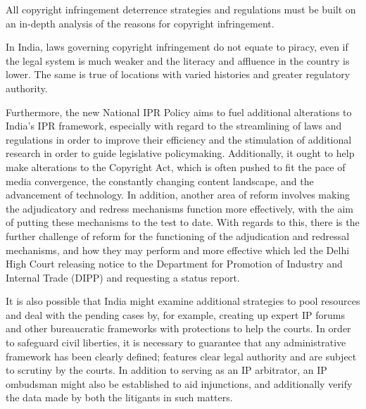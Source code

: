 \begin{multicols}{2}

\noi
All copyright infringement deterrence strategies and regulations must be built on an in-depth
analysis of the reasons for copyright infringement.

\noi
In India, laws governing copyright infringement do not equate to piracy, even if the legal
system is much weaker and the literacy and affluence in the country is lower. The same is
true of locations with varied histories and greater regulatory authority.

\noi
Furthermore, the new National IPR Policy aims to fuel additional alterations to India's IPR
framework, especially with regard to the streamlining of laws and regulations in order to
improve their efficiency and the stimulation of additional research in order to guide
legislative policymaking. Additionally, it ought to help make alterations to the Copyright Act,
which is often pushed to fit the pace of media convergence, the constantly changing content
landscape, and the advancement of technology. In addition, another area of reform involves
making the adjudicatory and redress mechanisms function more effectively, with the aim of
putting these mechanisms to the test to date. With regards to this, there is the further
challenge of reform for the functioning of the adjudication and redressal mechanisms, and
how they may perform and more effective which led the Delhi High Court releasing notice to
the Department for Promotion of Industry and Internal Trade (DIPP) and requesting a status
report.

\noi
It is also possible that India might examine additional strategies to pool resources and deal
with the pending cases by, for example, creating up expert IP forums and other bureaucratic
frameworks with protections to help the courts. In order to safeguard civil liberties, it is
necessary to guarantee that any administrative framework has been clearly defined; features
clear legal authority and are subject to scrutiny by the courts. In addition to serving as an IP
arbitrator, an IP ombudsman might also be established to aid injunctions, and additionally
verify the data made by both the litigants in such matters.

\end{multicols}
\label{end2019-art3}
